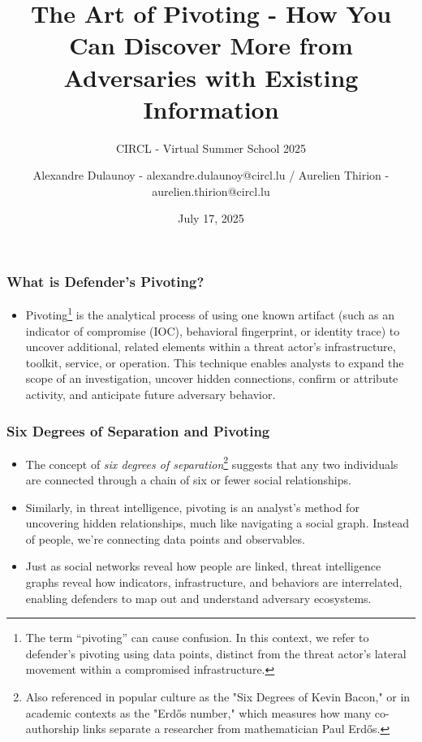 \documentclass[10pt,aspectratio=169, colorlinks=true, linkcolor=circlBlue]{beamer}
\title{The Art of Pivoting - How You Can Discover More from Adversaries with Existing Information}
\subtitle{CIRCL - Virtual Summer School 2025}
\date{July 17, 2025}
\author{Alexandre Dulaunoy - alexandre.dulaunoy@circl.lu / Aurelien Thirion - aurelien.thirion@circl.lu}
\institute{CIRCL \normalurl{https://www.circl.lu}}
\begin{document}



\begin{frame}
	\titlepage%
\end{frame}




\begin{frame}
    \frametitle{What is Defender's Pivoting?}
    \begin{itemize}
	    \item Pivoting\footnote{The term “pivoting” can cause confusion. In this context, we refer to defender's pivoting using data points, distinct from the threat actor's lateral movement within a compromised infrastructure.} is the analytical process of using one known artifact (such as an indicator of compromise (IOC), behavioral fingerprint, or identity trace) to uncover additional, related elements within a threat actor’s infrastructure, toolkit, service, or operation. This technique enables analysts to expand the scope of an investigation, uncover hidden connections, confirm or attribute activity, and anticipate future adversary behavior.
    \end{itemize}
\end{frame}

\begin{frame}
    \frametitle{Six Degrees of Separation and Pivoting}
    \begin{itemize}
        \item The concept of \textit{six degrees of separation}\footnote{Also referenced in popular culture as the "Six Degrees of Kevin Bacon," or in academic contexts as the "Erdős number," which measures how many co-authorship links separate a researcher from mathematician Paul Erdős.} suggests that any two individuals are connected through a chain of six or fewer social relationships.
        \item Similarly, in threat intelligence, pivoting is an analyst's method for uncovering hidden relationships, much like navigating a social graph. Instead of people, we’re connecting data points and observables.
        \item Just as social networks reveal how people are linked, threat intelligence graphs reveal how indicators, infrastructure, and behaviors are interrelated, enabling defenders to map out and understand adversary ecosystems.
    \end{itemize}
\end{frame}
\end{document}
